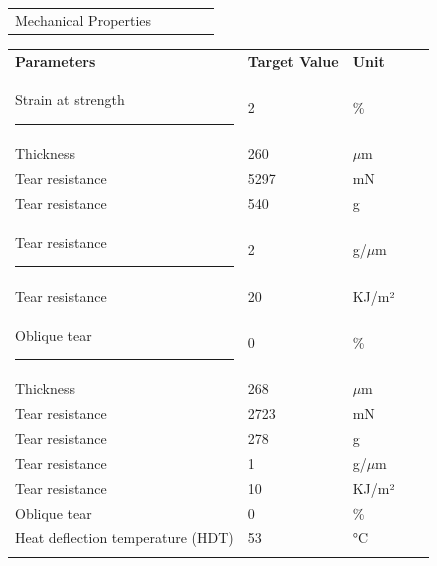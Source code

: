 \documentclass{article}
\begin{document}
\begin{center}
\begin{tabularx}
{\textwidth}{X l  l  l  l }\rowcolor{color_title}Mechanical Properties &  &  &  &  \\

\end{tabularx}\begin{paracol}{2}
\begin{tabularx}{0.5\textwidth}
{X l  l  l  l }\textbf{Parameters} & \textbf{Target Value} & \textbf{Unit} &  &  \\
Strain at strength \rule{80pt}{0pt} & 2 & \% &  &  \\
\arrayrulecolor{line_color}\hline
Thickness & 260 & \(\mu\)m &  &  \\
\arrayrulecolor{line_color}\hline
Tear resistance & 5297 & mN &  &  \\
\arrayrulecolor{line_color}\hline
Tear resistance & 540 & g &  &  \\
\arrayrulecolor{line_color}\hline
Tear resistance \rule{80pt}{0pt} & 2 & g/\(\mu\)m &  &  \\
\arrayrulecolor{line_color}\hline
Tear resistance & 20 & KJ/m² &  &  \\
\arrayrulecolor{line_color}\hline
Oblique tear \rule{80pt}{0pt} & 0 & \% &  &  \\
\arrayrulecolor{line_color}\hline
Thickness & 268 & \(\mu\)m &  &  \\
\arrayrulecolor{line_color}\hline
Tear resistance & 2723 & mN &  &  \\
\arrayrulecolor{line_color}\hline
Tear resistance & 278 & g &  &  \\
\arrayrulecolor{line_color}\hline
Tear resistance & 1 & g/\(\mu\)m &  &  \\
\arrayrulecolor{line_color}\hline
Tear resistance & 10 & KJ/m² &  &  \\
\arrayrulecolor{line_color}\hline
Oblique tear & 0 & \% &  &  \\
\arrayrulecolor{line_color}\hline
Heat deflection temperature (HDT) & 53 & °C &  &  \\
\arrayrulecolor{line_color}\hline


\end{tabularx}
\end{paracol}
\end{center}
\end{document}
